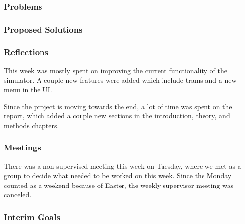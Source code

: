 \subsubsection{Problems}


\subsubsection{Proposed Solutions}


\subsubsection{Reflections}

    This week was mostly spent on improving the current functionality of the simulator. A couple new features were added which include trams and a new menu in the UI. 

    Since the project is moving towards the end, a lot of time was spent on the report, which added a couple new sections in the introduction, theory, and methods chapters.

\subsubsection{Meetings}

    There was a non-supervised meeting this week on Tuesday, where we met as a group to decide what needed to be worked on this week. Since the Monday counted as a weekend because of Easter, the weekly supervisor meeting was canceled.

\subsubsection{Interim Goals}

    


